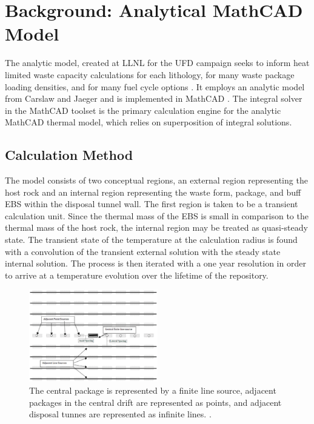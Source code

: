 \section{Background: Analytical MathCAD Model}

The analytic model, created at \gls{LLNL} for the \gls{UFD} campaign seeks to 
inform heat limited waste capacity calculations for each lithology, for many 
waste package loading densities, and for many fuel cycle options 
\cite{hardin_generic_2011, greenberg_investigations_2012, 
greenberg_application_2012}. It employs an analytic model from Carslaw and 
Jaeger and is implemented in MathCAD \cite{carslaw_conduction_1959, 
ptc_mathcad_2010}.  The integral solver in the MathCAD toolset is the primary 
calculation engine for the analytic MathCAD thermal model, which relies on 
superposition of integral solutions.  

\subsection{Calculation Method}

The model consists of two conceptual regions, an external region representing 
the host rock and an internal region representing the waste form, package, and 
buff \gls{EBS} within the disposal tunnel wall. The first region is taken to be  
a transient calculation unit.  Since the thermal mass of the \gls{EBS} is small 
in comparison to the thermal mass of the host rock, the internal region may be 
treated as quasi-steady state. The transient state of the temperature at the 
calculation radius is found with a convolution of the transient external 
solution with the steady state internal solution.  The process is then iterated 
with a one year resolution in order to arrive at a temperature evolution over 
the lifetime of the repository. 

\begin{figure}[h!]
  \begin{center}
    \includegraphics[width=0.5\textwidth]{./chapters/litrev/llnlConcept.eps}
  \end{center}
  \caption{The central package is represented by a finite line source, adjacent 
  packages in the central drift are represented as points, and adjacent disposal 
  tunnes are represented as infinite lines.
  \cite{greenberg_investigations_2012}.}
  \label{fig:llnl}
\end{figure}

